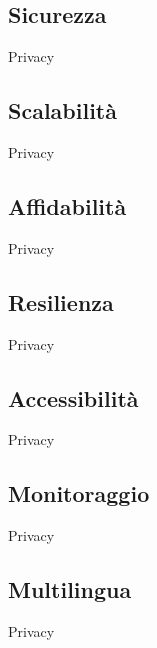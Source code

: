 \documentclass{article}
\begin{document}
\subsection{Sicurezza}\label{rnf_2}
\begin{description}
    \item Privacy
\end{description}

\subsection{Scalabilità}\label{rnf_3}
\begin{description}
    \item Privacy
\end{description}

\subsection{Affidabilità}\label{rnf_4}
\begin{description}
    \item Privacy
\end{description}

\subsection{Resilienza}\label{rnf_5}
\begin{description}
    \item Privacy
\end{description}

\subsection{Accessibilità}\label{rnf_6}
\begin{description}
    \item Privacy
\end{description}

\subsection{Monitoraggio}\label{rnf_7}
\begin{description}
    \item Privacy
\end{description}

\subsection{Multilingua}\label{rnf_8}
\begin{description}
    \item Privacy
\end{description}
\end{document}
